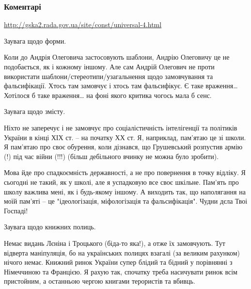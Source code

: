  
 
 
 
 
\subsubsection{Коментарі}

\begin{itemize} %
\url{http://gska2.rada.gov.ua/site/const/universal-4.html}

Заувага щодо форми.

Коли до Андрія Олеговича застосовують шаблони, Андрію Олеговичу це не
подобається, як і кожному іншому. Але сам Андрій Олегович не проти використати
шаблони/стереотипи/узагальнення щодо замовчування та фальсифікації. Хтось там
замовчує і хтось там фальсифікує. Є таке враження… Хотілося б таке враження… на
фоні якого критика чогось мала б сенс.

Заувага щодо змісту.

Ніхто не заперечує і не замовчує про соціалістичність інтелігенції та політиків
України в кінці ХІХ ст. – на початку ХХ ст. Я, наприклад, пам'ятаю це зі школи.
Я пам'ятаю про своє обурення, коли дізнався, що Грушевський розпустив армію (!)
під час війни (!!!) (більш дебільного вчинку не можна було зробити).

Мова йде про спадкоємність державності, а не про повернення в точку відліку. Я
сьогодні не такий, як у школі, але я успадковую все своє шкільне. Пам'ять про
школу важлива мені, як і будь-якому іншому. А виходить так, що наполягання на
моїй пам'яті – це "ідеологізація, міфологізація та фальсифікація". Чудни дєла
Твоі Госпаді!

Заувага щодо книжних полиць.

Немає видань Лєніна і Троцького (біда-то яка!), а отже їх замовчують. Тут
відверта маніпуляція, бо на українських полицях взагалі (за великим рахунком)
нічого немає. Книжний ринок України супер блідий та бідний у порівнянні з
Німеччиною та Францією. Я рахую так, спочатку треба насичувати ринок всім
пристойним, а останньою чергою книгами терористів та вбивць.


\end{itemize}
